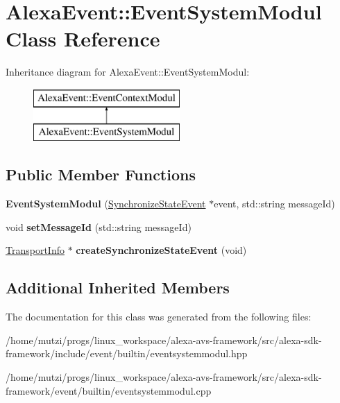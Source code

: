 \hypertarget{classAlexaEvent_1_1EventSystemModul}{}\section{Alexa\+Event\+:\+:Event\+System\+Modul Class Reference}
\label{classAlexaEvent_1_1EventSystemModul}
Inheritance diagram for Alexa\+Event\+:\+:Event\+System\+Modul\+:\begin{figure}[H]
\begin{center}
\leavevmode
\includegraphics[height=2.000000cm]{df/d9b/classAlexaEvent_1_1EventSystemModul}
\end{center}
\end{figure}
\subsection*{Public Member Functions}
\begin{DoxyCompactItemize}
\item 
\mbox{\label{classAlexaEvent_1_1EventSystemModul_ad57898bfa0dab4ffea5552d65fb5cc8b}} 
{\bfseries Event\+System\+Modul} (\hyperlink{structAlexaEvent_1_1SynchronizeStateEvent}{Synchronize\+State\+Event} $\ast$event, std\+::string message\+Id)
\item 
\mbox{\label{classAlexaEvent_1_1EventSystemModul_a18069497240044a5ed96fa6fc77384f4}} 
void {\bfseries set\+Message\+Id} (std\+::string message\+Id)
\item 
\mbox{\label{classAlexaEvent_1_1EventSystemModul_a83c5438c43b6e9ee2d2b503909945a7d}} 
\hyperlink{classAlexaEvent_1_1TransportInfo}{Transport\+Info} $\ast$ {\bfseries create\+Synchronize\+State\+Event} (void)
\end{DoxyCompactItemize}
\subsection*{Additional Inherited Members}


The documentation for this class was generated from the following files\+:\begin{DoxyCompactItemize}
\item 
/home/mutzi/progs/linux\+\_\+workspace/alexa-\/avs-\/framework/src/alexa-\/sdk-\/framework/include/event/builtin/eventsystemmodul.\+hpp\item 
/home/mutzi/progs/linux\+\_\+workspace/alexa-\/avs-\/framework/src/alexa-\/sdk-\/framework/event/builtin/eventsystemmodul.\+cpp\end{DoxyCompactItemize}
